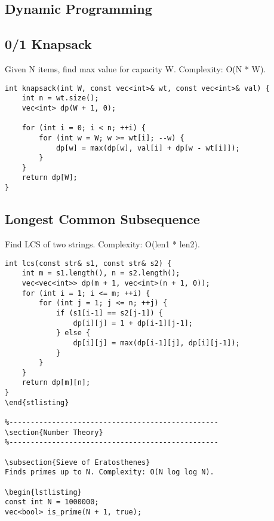 \documentclass[10pt]{article}
\begin{document}
\begin{multicols}{2}
\newpage
\section{Dynamic Programming}

\subsection{0/1 Knapsack}
Given N items, find max value for capacity W. Complexity: O(N * W).

\begin{lstlisting}
int knapsack(int W, const vec<int>& wt, const vec<int>& val) {
    int n = wt.size();
    vec<int> dp(W + 1, 0);

    for (int i = 0; i < n; ++i) {
        for (int w = W; w >= wt[i]; --w) {
            dp[w] = max(dp[w], val[i] + dp[w - wt[i]]);
        }
    }
    return dp[W];
}
\end{lstlisting}

\subsection{Longest Common Subsequence}
Find LCS of two strings. Complexity: O(len1 * len2).

\begin{lstlisting}
int lcs(const str& s1, const str& s2) {
    int m = s1.length(), n = s2.length();
    vec<vec<int>> dp(m + 1, vec<int>(n + 1, 0));
    for (int i = 1; i <= m; ++i) {
        for (int j = 1; j <= n; ++j) {
            if (s1[i-1] == s2[j-1]) {
                dp[i][j] = 1 + dp[i-1][j-1];
            } else {
                dp[i][j] = max(dp[i-1][j], dp[i][j-1]);
            }
        }
    }
    return dp[m][n];
}
\end{stlisting}

%-------------------------------------------------
\section{Number Theory}
%-------------------------------------------------

\subsection{Sieve of Eratosthenes}
Finds primes up to N. Complexity: O(N log log N).

\begin{lstlisting}
const int N = 1000000;
vec<bool> is_prime(N + 1, true);


\end{lstlisting}
\end{multicols}
\end{document}
